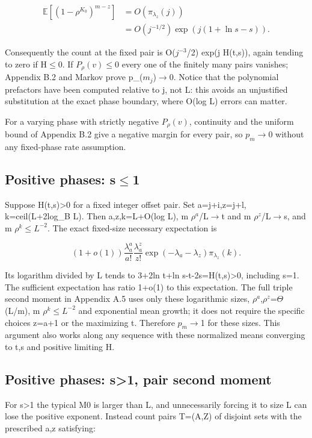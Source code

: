 \documentclass[11pt]{article}
\begin{document}
\[
\begin{aligned}\mathbb E[(1-\rho^{K_0})^{m-z}]&=O(\pi_{\lambda_z}(j))\\
&=O(j^{-1/2})\exp(j(1+\ln s-s)).\end{aligned}
\]

Consequently the count at the fixed pair is O($j^{-3}$/2) exp(j H(t,s)), again tending to zero if H\ensuremath{\leq}0. If $P_\rho(v)$\ensuremath{\leq}0 every one of the finitely many pairs vanishes; Appendix B.2 and Markov prove p\_($m_{j}$)\ensuremath{\to}0. Notice that the polynomial prefactors have been computed relative to j, not L: this avoids an unjustified substitution at the exact phase boundary, where O(log L) errors can matter.

For a varying phase with strictly negative $P_\rho(v)$, continuity and the uniform bound of Appendix B.2 give a negative margin for every pair, so $p_m$\ensuremath{\to}0 without any fixed-phase rate assumption.

\subsection{Positive phases: s\ensuremath{\leq}1}

Suppose H(t,s)>0 for a fixed integer offset pair. Set a=j+i,z=j+l, k=ceil(L+2log\_B L). Then a,z,k=L+O(log L), m $\rho^{a}$/L\ensuremath{\to}t and m $\rho^{z}$/L\ensuremath{\to}s, and m $\rho^{k}$\ensuremath{\leq}$L^{-2}$. The exact fixed-size necessary expectation is

\[
(1+o(1))\frac{\lambda_a^a}{a!}\frac{\lambda_a^z}{z!}\exp(-\lambda_a-\lambda_z)\pi_{\lambda_z}(k).
\]

Its logarithm divided by L tends to 3+2ln t+ln s-t-2s=H(t,s)>0, including s=1. The sufficient expectation has ratio 1+o(1) to this expectation. The full triple second moment in Appendix A.5 uses only these logarithmic sizes, $\rho^{a}$,$\rho^{z}$=$\Theta$(L/m), m $\rho^{k}$\ensuremath{\leq}$L^{-2}$ and exponential mean growth; it does not require the specific choices z=a+1 or the maximizing t. Therefore $p_m$\ensuremath{\to}1 for these sizes. This argument also works along any sequence with these normalized means converging to t,s and positive limiting H.

\subsection{Positive phases: s>1, pair second moment}

For s>1 the typical M0 is larger than L, and unnecessarily forcing it to size L can lose the positive exponent. Instead count pairs T=(A,Z) of disjoint sets with the prescribed a,z satisfying:
\end{document}
